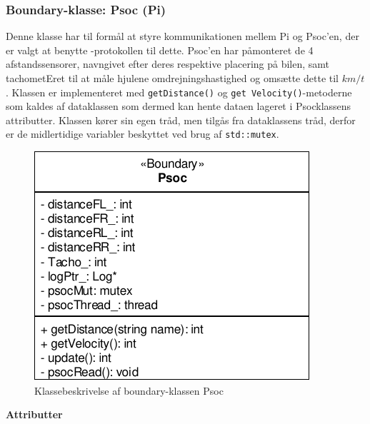 \subsubsection{Boundary-klasse: Psoc (Pi)}\label{sec:sw_design_psoc_pi}

Denne klasse har til formål at styre kommunikationen mellem Pi og Psoc'en, der er valgt at benytte \IIC-protokollen til dette. Psoc'en har påmonteret de 4 afstandssensorer, navngivet efter deres respektive placering på bilen, samt tachometEret til at måle hjulene omdrejningshastighed og omsætte dette til $km/t$. Klassen er implementeret med \texttt{getDistance()} og \texttt{get Velocity()}-metoderne som kaldes af dataklassen som dermed kan hente dataen lageret i Psocklassens attributter. Klassen kører sin egen tråd, men tilgås fra dataklassens tråd, derfor er de midlertidige variabler beskyttet ved brug af \texttt{std::mutex}.

\begin{figure}[h]
\centering
\includegraphics[]{../fig/diagrammer/bil/cd_psoc.pdf}
\caption{Klassebeskrivelse af boundary-klassen Psoc}
\label{fig:cd_psoc}
\end{figure}

\textbf{Attributter}

